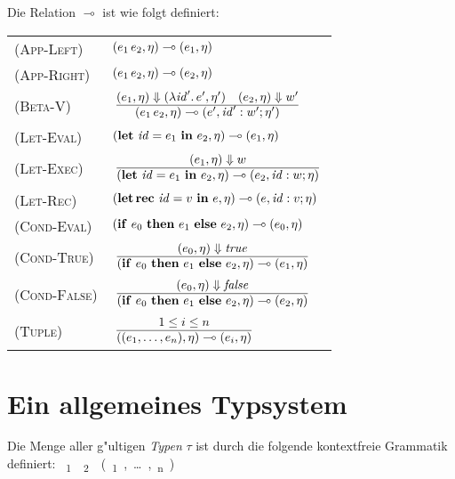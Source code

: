 \documentclass[12pt,fleqn,a4paper]{article}
\newcommand{\RN}[1]{\mbox{\textsc{(#1)}}}
\newcommand{\cl}{\name{cl}}
\begin{document}

\begin{definition}
  Die Relation $\multimap$ ist wie folgt definiert: \\[5mm]
  \begin{tabular}{ll}
    \RN{App-Left}   & $(e_1\,e_2,\eta) \multimap (e_1,\eta)$ \\[1mm]
    \RN{App-Right}  & $(e_1\,e_2,\eta) \multimap (e_2,\eta)$ \\[1mm]
    \RN{Beta-V}     & $\regel{(e_1,\eta) \Downarrow (\abstr{\id'}{e'},\eta')
                              \quad (e_2,\eta) \Downarrow w'}
                             {(\app{e_1}{e_2},\eta) \multimap (e',\id':w';\eta')}$ \\[3mm]
    \RN{Let-Eval}   & $(\mathbf{let}\ {\text{\it id\/}} = e_1\ \mathbf{in}\ e_2,\eta) \multimap (e_1,\eta)$ \\[1mm]
    \RN{Let-Exec}   & $\regel{(e_1,\eta) \Downarrow w}
                             {(\bli{\id}{e_1}{e_2},\eta) \multimap (e_2,\id:w;\eta)}$ \\[3mm]
    \RN{Let-Rec}    & $(\mathbf{let}\,\mathbf{rec}\ {\text{\it id\/}} = v\ \mathbf{in}\ e,\eta) \multimap (e,{\text{\it id\/}}:v;\eta)$ \\[1mm]
    \RN{Cond-Eval}  & $(\mathbf{if}\ e_0\ \mathbf{then}\ e_1\ \mathbf{else}\ e_2,\eta) \multimap (e_0,\eta)$ \\[1mm]
    \RN{Cond-True}  & $\regel{(e_0,\eta) \Downarrow \true}
                             {(\bifte{e_0}{e_1}{e_2},\eta) \multimap (e_1,\eta)}$ \\[3mm]
    \RN{Cond-False} & $\regel{(e_0,\eta) \Downarrow \false}
                             {(\bifte{e_0}{e_1}{e_2},\eta) \multimap (e_2,\eta)}$ \\[3mm]
    \RN{Tuple}      & $\regel{1 \le i \le n}
                             {((e_1,\ldots,e_n),\eta) \multimap (e_i,\eta)}$ \\[3mm]
  \end{tabular}
\end{definition}


\section{Ein allgemeines Typsystem}

\begin{definition}[Typen]
  Die Menge aller g"ultigen \emph{Typen} $\tau$ ist durch die folgende
  kontextfreie Grammatik definiert:
  \bgram
  \tau \is \bool \mid \z \mid \unit
  \al \tau_1 \to \tau_2 \mid (\tau_1,\ldots,\tau_n)
  \egram
\end{definition}
\end{document}
